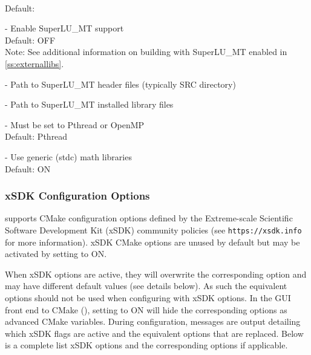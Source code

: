 \begin{description}
  \\
  Default: 
\item[\id{SUPERLUMT\_ENABLE}] - 
  Enable SuperLU\_MT support   
  \\
  Default: OFF 
  \\
  Note: See additional information on building with SuperLU\_MT enabled
  in \ref{ss:externallibs}.
\item[\id{SUPERLUMT\_INCLUDE\_DIR}] - 
  Path to SuperLU\_MT header files (typically SRC directory)
\item[\id{SUPERLUMT\_LIBRARY\_DIR}] - 
  Path to SuperLU\_MT installed library files
\item[\id{SUPERLUMT\_THREAD\_TYPE}] - 
  Must be set to Pthread or OpenMP
  \\
  Default: Pthread
\item[\id{USE\_GENERIC\_MATH}] -   
  Use generic (stdc) math libraries
  \\
  Default: ON 
\end{description}

\subsubsection*{xSDK Configuration Options}

{\sundials} supports CMake configuration options defined by the
Extreme-scale Scientific Software Development Kit (xSDK) community
policies (see {\tt https://xsdk.info} for more information). xSDK
CMake options are unused by default but may be activated by setting
 to ON.

{\warn} When xSDK options are active, they will overwrite the
corresponding {\sundials} option and may have different default values
(see details below). As such the equivalent {\sundials} options should
not be used when configuring with xSDK options. In the GUI front end
to CMake (), setting  to ON will
hide the corresponding {\sundials} options as advanced CMake variables.
During configuration, messages are output detailing
which xSDK flags are active and the equivalent {\sundials} options
that are replaced. Below is a complete list xSDK options and the
corresponding {\sundials} options if applicable.

